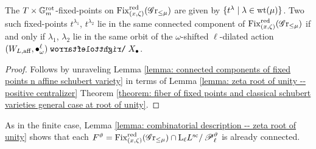 \begin{lemma}\label{lemma: combinatorial description -- zeta root of unity}
The $T\times \mathbb{G}_m^{\mathrm{rot}}$-fixed-points on $\operatorname{Fix}^{\operatorname{red}}_{(x, \zeta)}(\operatorname{\mathscr{G}r}_{\leq \mu})$ are given by $\{ t^{\lambda} \mid \lambda \in \operatorname{wt}(\mu) \}$. Two such fixed-points $t^{\lambda_1}$, $t^{\lambda_2}$ lie in the same connected component of $\operatorname{Fix}^{\operatorname{red}}_{(x, \zeta)}(\operatorname{\mathscr{G}r}_{\leq \mu})$ if and only if $\lambda_1$, $\lambda_2$ lie in the same orbit of the $\omega$-shifted $\ell$-dilated action $(W_{L, \aff}, \bullet^{\ell}_{\omega}) \acts X_{\bullet}$.    
\end{lemma}
\begin{proof}
Follows by unraveling Lemma \ref{lemma: connected components of fixed points n affine schubert variety} in terms of Lemma \ref{lemma: zeta root of unity -- positive centralizer} Theorem \ref{theorem: fiber of fixed points and classical schubert varieties general case at root of unity}.
\end{proof}

As in the finite case, Lemma \ref{lemma: combinatorial description -- zeta root of unity} shows that each $F^{\vartheta} = \operatorname{Fix}^{\operatorname{red}}_{(x, \zeta)}(\operatorname{\mathscr{G}r}_{\leq \mu}) \cap \mathrm{L}_{\ell} L^{\mathrm{sc}}/\operatorname{\mathscr{P}}_{\ell}^{\vartheta}$ is already connected.